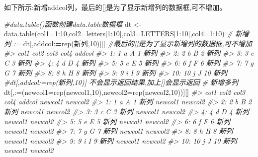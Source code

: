 \documentclass[
]{book}
\newenvironment{Shaded}{\begin{snugshade}}{\end{snugshade}}
\newcommand{\AttributeTok}[1]{\textcolor[rgb]{0.77,0.63,0.00}{#1}}
\newcommand{\CommentTok}[1]{\textcolor[rgb]{0.56,0.35,0.01}{\textit{#1}}}
\newcommand{\DecValTok}[1]{\textcolor[rgb]{0.00,0.00,0.81}{#1}}
\newcommand{\ErrorTok}[1]{\textcolor[rgb]{0.64,0.00,0.00}{\textbf{#1}}}
\newcommand{\FunctionTok}[1]{\textcolor[rgb]{0.00,0.00,0.00}{#1}}
\newcommand{\NormalTok}[1]{#1}
\newcommand{\OtherTok}[1]{\textcolor[rgb]{0.56,0.35,0.01}{#1}}
\newcommand{\SpecialCharTok}[1]{\textcolor[rgb]{0.00,0.00,0.00}{#1}}
\newcommand{\StringTok}[1]{\textcolor[rgb]{0.31,0.60,0.02}{#1}}
\begin{document}
如下所示:新增addcol列，最后的{[}{]}是为了显示新增列的数据框,可不增加。

\begin{Shaded}
\begin{Highlighting}[]
\CommentTok{\#data.table()函数创建data.table数据框}
\NormalTok{dt }\OtherTok{\textless{}{-}} \FunctionTok{data.table}\NormalTok{(}\AttributeTok{col1=}\DecValTok{1}\SpecialCharTok{:}\DecValTok{10}\NormalTok{,}\AttributeTok{col2=}\NormalTok{letters[}\DecValTok{1}\SpecialCharTok{:}\DecValTok{10}\NormalTok{],}\AttributeTok{col3=}\NormalTok{LETTERS[}\DecValTok{1}\SpecialCharTok{:}\DecValTok{10}\NormalTok{],}\AttributeTok{col4=}\DecValTok{1}\SpecialCharTok{:}\DecValTok{10}\NormalTok{)}
\CommentTok{\# 新增列 :=}
\NormalTok{dt[,addcol}\SpecialCharTok{:}\ErrorTok{=}\FunctionTok{rep}\NormalTok{(}\StringTok{\textquotesingle{}新列\textquotesingle{}}\NormalTok{,}\DecValTok{10}\NormalTok{)][] }\CommentTok{\#最后的[]是为了显示新增列的数据框,可不增加}
\CommentTok{\#\textgreater{}     col1 col2 col3 col4 addcol}
\CommentTok{\#\textgreater{}  1:    1    a    A    1   新列}
\CommentTok{\#\textgreater{}  2:    2    b    B    2   新列}
\CommentTok{\#\textgreater{}  3:    3    c    C    3   新列}
\CommentTok{\#\textgreater{}  4:    4    d    D    4   新列}
\CommentTok{\#\textgreater{}  5:    5    e    E    5   新列}
\CommentTok{\#\textgreater{}  6:    6    f    F    6   新列}
\CommentTok{\#\textgreater{}  7:    7    g    G    7   新列}
\CommentTok{\#\textgreater{}  8:    8    h    H    8   新列}
\CommentTok{\#\textgreater{}  9:    9    i    I    9   新列}
\CommentTok{\#\textgreater{} 10:   10    j    J   10   新列}
\CommentTok{\#dt[,addcol:=rep(\textquotesingle{}新列\textquotesingle{},10)] 不会显示返回结果,加上[]会显示返回}
\CommentTok{\# 新增多列}
\NormalTok{dt[,}\StringTok{\textasciigrave{}}\AttributeTok{:=}\StringTok{\textasciigrave{}}\NormalTok{(}\AttributeTok{newcol1=}\FunctionTok{rep}\NormalTok{(}\StringTok{\textquotesingle{}newcol1\textquotesingle{}}\NormalTok{,}\DecValTok{10}\NormalTok{),}\AttributeTok{newcol2=}\FunctionTok{rep}\NormalTok{(}\StringTok{\textquotesingle{}newcol2\textquotesingle{}}\NormalTok{,}\DecValTok{10}\NormalTok{))][]}
\CommentTok{\#\textgreater{}     col1 col2 col3 col4 addcol newcol1 newcol2}
\CommentTok{\#\textgreater{}  1:    1    a    A    1   新列 newcol1 newcol2}
\CommentTok{\#\textgreater{}  2:    2    b    B    2   新列 newcol1 newcol2}
\CommentTok{\#\textgreater{}  3:    3    c    C    3   新列 newcol1 newcol2}
\CommentTok{\#\textgreater{}  4:    4    d    D    4   新列 newcol1 newcol2}
\CommentTok{\#\textgreater{}  5:    5    e    E    5   新列 newcol1 newcol2}
\CommentTok{\#\textgreater{}  6:    6    f    F    6   新列 newcol1 newcol2}
\CommentTok{\#\textgreater{}  7:    7    g    G    7   新列 newcol1 newcol2}
\CommentTok{\#\textgreater{}  8:    8    h    H    8   新列 newcol1 newcol2}
\CommentTok{\#\textgreater{}  9:    9    i    I    9   新列 newcol1 newcol2}
\CommentTok{\#\textgreater{} 10:   10    j    J   10   新列 newcol1 newcol2}
\end{Highlighting}
\end{Shaded}
\end{document}
